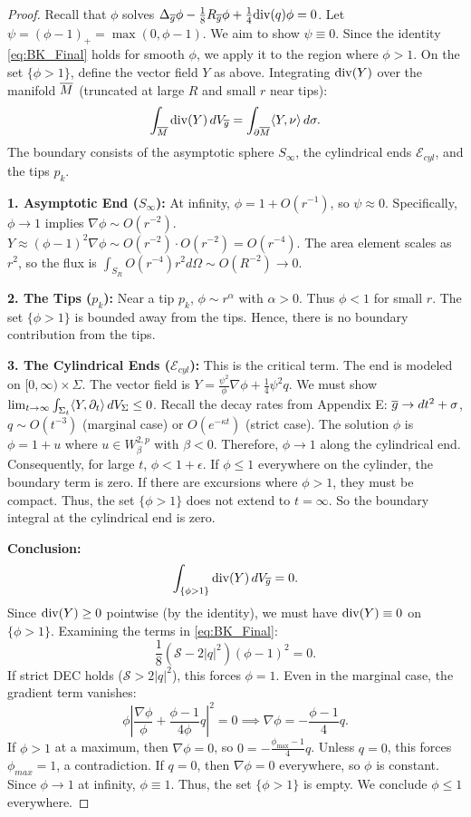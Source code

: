 \begin{proof}
Recall that $\phi$ solves $\Delta_{\overline{g}}\phi - \frac{1}{8}R_{\overline{g}}\phi + \frac{1}{4}\mathrm{div}(q)\phi = 0$.
Let $\psi = (\phi - 1)_+ = \max(0, \phi-1)$. We aim to show $\psi \equiv 0$.
Since the identity \eqref{eq:BK_Final} holds for smooth $\phi$, we apply it to the region where $\phi > 1$. On the set $\{\phi > 1\}$, define the vector field $Y$ as above.
Integrating $\mathrm{div}(Y)$ over the manifold $\overline{M}$ (truncated at large $R$ and small $r$ near tips):
\[
    \int_{\overline{M}} \mathrm{div}(Y) \,dV_{\overline{g}} = \int_{\partial \overline{M}} \langle Y, \nu \rangle \,d\sigma.
\]
The boundary consists of the asymptotic sphere $S_\infty$, the cylindrical ends $\mathcal{E}_{cyl}$, and the tips $p_k$.

\textbf{1. Asymptotic End ($S_\infty$):}
At infinity, $\phi = 1 + O(r^{-1})$, so $\psi \approx 0$. Specifically, $\phi \to 1$ implies $\nabla \phi \sim O(r^{-2})$.
$Y \approx (\phi-1)^2 \nabla \phi \sim O(r^{-2}) \cdot O(r^{-2}) = O(r^{-4})$.
The area element scales as $r^2$, so the flux is $\int_{S_R} O(r^{-4}) r^2 d\Omega \sim O(R^{-2}) \to 0$.

\textbf{2. The Tips ($p_k$):}
Near a tip $p_k$, $\phi \sim r^\alpha$ with $\alpha > 0$. Thus $\phi < 1$ for small $r$.
The set $\{\phi > 1\}$ is bounded away from the tips. Hence, there is no boundary contribution from the tips.

\textbf{3. The Cylindrical Ends ($\mathcal{E}_{cyl}$):}
This is the critical term. The end is modeled on $[0,\infty) \times \Sigma$.
The vector field is $Y = \frac{\psi^2}{\phi}\nabla \phi + \frac{1}{4}\psi^2 q$.
We must show $\lim_{t \to \infty} \int_{\Sigma_t} \langle Y, \partial_t \rangle \,dV_{\Sigma} \le 0$.
Recall the decay rates from Appendix E: $\overline{g} \to dt^2 + \sigma$, $q \sim O(t^{-3})$ (marginal case) or $O(e^{-\kappa t})$ (strict case).
The solution $\phi$ is $\phi = 1 + u$ where $u \in W^{2,p}_\beta$ with $\beta < 0$.
Therefore, $\phi \to 1$ along the cylindrical end.
Consequently, for large $t$, $\phi < 1 + \epsilon$.
If $\phi \le 1$ everywhere on the cylinder, the boundary term is zero.
If there are excursions where $\phi > 1$, they must be compact.
Thus, the set $\{\phi > 1\}$ does not extend to $t = \infty$.
So the boundary integral at the cylindrical end is zero.

\textbf{Conclusion:}
\[
    \int_{\{\phi > 1\}} \mathrm{div}(Y) \,dV_{\overline{g}} = 0.
\]
Since $\mathrm{div}(Y) \ge 0$ pointwise (by the identity), we must have $\mathrm{div}(Y) \equiv 0$ on $\{\phi > 1\}$.
Examining the terms in \eqref{eq:BK_Final}:
\[
    \frac{1}{8}(\mathcal{S} - 2|q|^2)(\phi-1)^2 = 0.
\]
If strict DEC holds ($\mathcal{S} > 2|q|^2$), this forces $\phi = 1$.
Even in the marginal case, the gradient term vanishes:
\[
    \phi \left| \frac{\nabla \phi}{\phi} + \frac{\phi-1}{4\phi}q \right|^2 = 0 \implies \nabla \phi = -\frac{\phi-1}{4}q.
\]
If $\phi > 1$ at a maximum, then $\nabla \phi = 0$, so $0 = -\frac{\phi_{\max}-1}{4}q$.
Unless $q=0$, this forces $\phi_{max}=1$, a contradiction.
If $q=0$, then $\nabla \phi = 0$ everywhere, so $\phi$ is constant. Since $\phi \to 1$ at infinity, $\phi \equiv 1$.
Thus, the set $\{\phi > 1\}$ is empty.
We conclude $\phi \le 1$ everywhere.
\end{proof}

